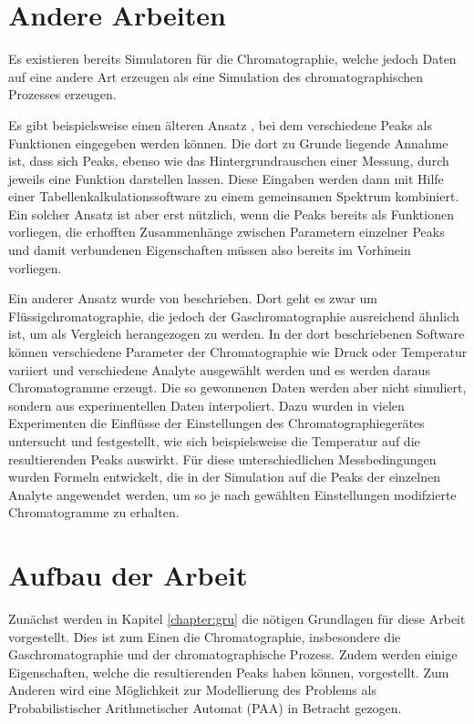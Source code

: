 \section{Andere Arbeiten}

Es existieren bereits Simulatoren für die Chromatographie, welche jedoch Daten auf eine andere Art erzeugen als eine Simulation des chromatographischen Prozesses erzeugen.

Es gibt beispielsweise einen älteren Ansatz \citep{spreadsheet}, bei dem verschiedene Peaks als Funktionen eingegeben werden können. Die dort zu Grunde liegende Annahme ist, dass sich Peaks, ebenso wie das Hintergrundrauschen einer Messung, durch jeweils eine Funktion darstellen lassen. Diese Eingaben werden dann mit Hilfe einer Tabellenkalkulationssoftware zu einem gemeinsamen Spektrum kombiniert. Ein solcher Ansatz ist aber erst nützlich, wenn die Peaks bereits als Funktionen vorliegen, die erhofften Zusammenhänge zwischen Parametern einzelner Peaks und damit verbundenen Eigenschaften müssen also bereits im Vorhinein vorliegen.

Ein anderer Ansatz wurde von \citet{hplcsim} beschrieben. Dort geht es zwar um Flüssigchromatographie, die jedoch der Gaschromatographie ausreichend ähnlich ist, um als Vergleich herangezogen zu werden. In der dort beschriebenen Software können verschiedene Parameter der Chromatographie wie Druck oder Temperatur variiert und verschiedene Analyte ausgewählt werden und es werden daraus Chromatogramme erzeugt. Die so gewonnenen Daten werden aber nicht simuliert, sondern aus experimentellen Daten interpoliert. Dazu wurden in vielen Experimenten die Einflüsse der Einstellungen des Chromatographiegerätes untersucht und festgestellt, wie sich beispielsweise die Temperatur auf die resultierenden Peaks auswirkt. Für diese unterschiedlichen Messbedingungen wurden Formeln entwickelt, die in der Simulation auf die Peaks der einzelnen Analyte angewendet werden, um so je nach gewählten Einstellungen modifzierte Chromatogramme zu erhalten.


\section{Aufbau der Arbeit}
Zunächst werden in Kapitel \ref{chapter:gru} die nötigen Grundlagen für diese Arbeit vorgestellt. Dies ist zum Einen die Chromatographie, insbesondere die Gaschromatographie und der chromatographische Prozess. Zudem werden einige Eigenschaften, welche die resultierenden Peaks haben können, vorgestellt. Zum Anderen wird eine Möglichkeit zur Modellierung des Problems als Probabilistischer Arithmetischer Automat (PAA) in Betracht gezogen.

